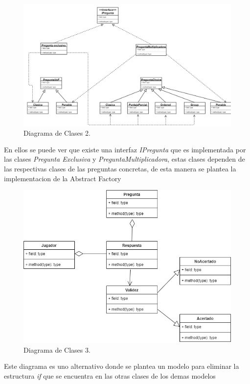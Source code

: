 \documentclass[titlepage,a4paper]{article}
\begin{document}
\begin{figure}[H]
\centering
\includegraphics[width=1.3\textwidth, center]{Diagrama de clases 2.png}
\caption{\label{fig:class01}Diagrama de Clases 2.}
\end{figure}

En ellos se puede ver que existe una interfaz \textit{IPregunta} que es implementada por las clases \textit{Pregunta Exclusiva} y \textit{PreguntaMultiplicadora}, estas clases dependen de las respectivas clases de las preguntas concretas, de esta manera se plantea la implementacion de la Abstract Factory

\begin{figure}[H]
\centering
\includegraphics[width=1.3\textwidth, center]{Diagrama de clases 4.jpg}
\caption{\label{fig:class01}Diagrama de Clases 3.}
\end{figure}

Este diagrama es uno alternativo donde se plantea un modelo para eliminar la estructura \textit{if} que se encuentra en las otras clases de los demas modelos
\end{document}
